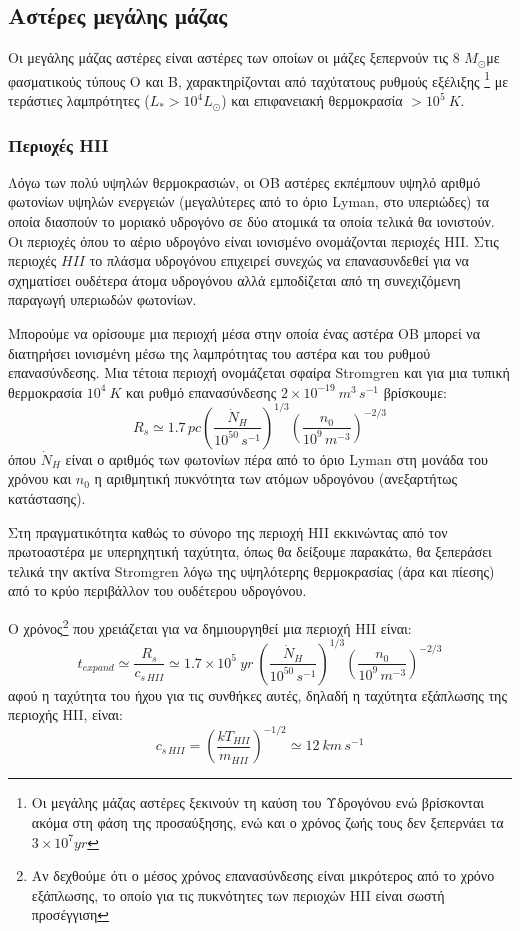 \documentclass[a4paper,12pt]{memoir}
\newcommand{\sm}{$M_{\odot}$}
\newcommand{\e}[1]{\times 10^{#1}}
\newcommand{\f}[3]{\left( \frac{#1}{#2} \right) ^{#3} }
\begin{document}
\subsection{Αστέρες μεγάλης μάζας}
Οι μεγάλης μάζας αστέρες είναι αστέρες των οποίων οι μάζες ξεπερνούν τις 8 \sm με φασματικούς τύπους O και B, χαρακτηρίζονται από ταχύτατους ρυθμούς εξέλιξης \footnote{Οι μεγάλης μάζας αστέρες ξεκινούν τη καύση του Υδρογόνου ενώ βρίσκονται ακόμα στη φάση της προσαύξησης, ενώ και ο χρόνος ζωής τους δεν ξεπερνάει τα $3 \times 10 ^7 yr$} με τεράστιες λαμπρότητες ($L_* > 10^4 L _ \odot$) και επιφανειακή θερμοκρασία $>10 ^5 \ K$.

\subsubsection{Περιοχές HII}
\label{par:HII regions}
Λόγω των πολύ υψηλών θερμοκρασιών, οι OB αστέρες εκπέμπουν υψηλό αριθμό φωτονίων υψηλών ενεργειών (μεγαλύτερες από το όριο Lyman, στο υπεριώδες) τα οποία διασπούν το μοριακό υδρογόνο σε δύο ατομικά τα οποία τελικά θα ιονιστούν. Οι περιοχές όπου το αέριο υδρογόνο είναι ιονισμένο ονομάζονται περιοχές HII. Στις περιοχές $HII$ το πλάσμα υδρογόνου επιχειρεί συνεχώς να επανασυνδεθεί για να σχηματίσει ουδέτερα άτομα υδρογόνου αλλά εμποδίζεται από τη συνεχιζόμενη παραγωγή υπεριωδών φωτονίων.

Μπορούμε να ορίσουμε μια περιοχή μέσα στην οποία ένας αστέρα OB μπορεί να διατηρήσει ιονισμένη μέσω της λαμπρότητας του αστέρα και του ρυθμού επανασύνδεσης. Μια τέτοια περιοχή ονομάζεται σφαίρα Stromgren και για μια τυπική θερμοκρασία $10^4 \ K$ και ρυθμό επανασύνδεσης $2 \e{-19} \ m^3 \,s^{-1}$ βρίσκουμε:
\begin{equation}
R_s \simeq 1.7 \, pc \left( \frac{\dot{N}_H}{10^{50} \, s^{-1}} \right)^{1/3} \left( \frac{n_0}{10^9 \, m^{-3}} \right) ^{-2/3}
\end{equation}
όπου $\dot{N}_H$ είναι ο αριθμός των φωτονίων πέρα από το όριο Lyman στη μονάδα του χρόνου και $n_0$ η αριθμητική πυκνότητα των ατόμων υδρογόνου (ανεξαρτήτως κατάστασης).

Στη πραγματικότητα καθώς το σύνορο της περιοχή HII εκκινώντας από τον πρωτοαστέρα με υπερηχητική ταχύτητα, όπως θα δείξουμε παρακάτω, θα ξεπεράσει τελικά την ακτίνα Stromgren λόγω της υψηλότερης θερμοκρασίας (άρα και πίεσης) από το κρύο περιβάλλον του ουδέτερου υδρογόνου. 

Ο χρόνος\footnote{Aν δεχθούμε ότι ο μέσος χρόνος επανασύνδεσης είναι μικρότερος από το χρόνο εξάπλωσης, το οποίο για τις πυκνότητες των περιοχών HII είναι σωστή προσέγγιση} που χρειάζεται για να δημιουργηθεί μια περιοχή HII είναι:
\begin{equation}
t_{expand} \simeq \frac{R_s}{c_{s \, HII}} \simeq 1.7\e{5} \ yr \ \f{\dot{N}_H}{10^{50} \, s^{-1}}{1/3} \f{n_0}{10^9 \, m^{-3}}{-2/3}
\end{equation}
αφού η ταχύτητα του ήχου για τις συνθήκες αυτές, δηλαδή η ταχύτητα εξάπλωσης της περιοχής HII, είναι:
\begin{equation}
c_{s \, HII} = \f{kT_{HII}}{m_{HII}}{-1/2} \simeq 12 \ km\,s^{-1}
\end{equation}
\end{document}
